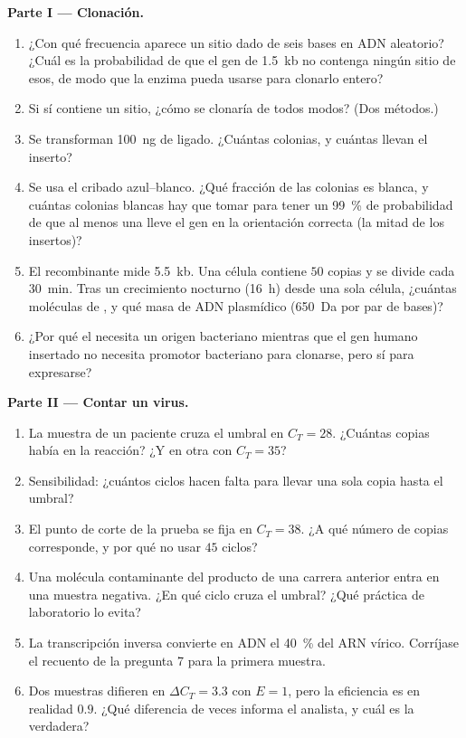 \begin{problem}
\medskip
\noindent\textbf{Parte I --- Clonación.}
\begin{enumerate}
  \item ¿Con qué frecuencia aparece un sitio dado de seis bases en ADN
        aleatorio? ¿Cuál es la probabilidad de que el gen de
        \qty{1.5}{kb} no contenga ningún sitio de esos, de modo que la
        enzima pueda usarse para clonarlo entero?
  \item Si sí contiene un sitio, ¿cómo se clonaría de todos modos? (Dos
        métodos.)
  \item Se transforman \qty{100}{ng} de  ligado. ¿Cuántas
        colonias, y cuántas llevan el inserto?
  \item Se usa el cribado azul--blanco. ¿Qué fracción de las colonias es
        blanca, y cuántas colonias blancas hay que tomar para tener un
        \qty{99}{\%} de probabilidad de que al menos una lleve el gen en
        la orientación correcta (la mitad de los insertos)?
  \item El  recombinante mide \qty{5.5}{kb}. Una célula contiene
        $50$ copias y se divide cada \qty{30}{min}. Tras un crecimiento
        nocturno (\qty{16}{h}) desde una sola célula, ¿cuántas moléculas
        de , y qué masa de ADN plasmídico (\qty{650}{Da} por par
        de bases)?
  \item ¿Por qué el  necesita un origen bacteriano mientras que
        el gen humano insertado no necesita promotor bacteriano para
        clonarse, pero sí para expresarse?
\end{enumerate}

\medskip
\noindent\textbf{Parte II --- Contar un virus.}
\begin{enumerate}[resume]
  \item La muestra de un paciente cruza el umbral en $C_{T} = 28$.
        ¿Cuántas copias había en la reacción? ¿Y en otra con
        $C_{T} = 35$?
  \item Sensibilidad: ¿cuántos ciclos hacen falta para llevar una sola
        copia hasta el umbral?
  \item El punto de corte de la prueba se fija en $C_{T} = 38$. ¿A qué
        número de copias corresponde, y por qué no usar $45$ ciclos?
  \item Una molécula contaminante del producto de una carrera anterior
        entra en una muestra negativa. ¿En qué ciclo cruza el umbral?
        ¿Qué práctica de laboratorio lo evita?
  \item La transcripción inversa convierte en ADN el \qty{40}{\%} del
        ARN vírico. Corríjase el recuento de la pregunta 7 para la
        primera muestra.
  \item Dos muestras difieren en $\Delta C_{T} = 3.3$ con $E = 1$, pero
        la eficiencia es en realidad $0.9$. ¿Qué diferencia de veces
        informa el analista, y cuál es la verdadera?
\end{enumerate}


\end{problem}
